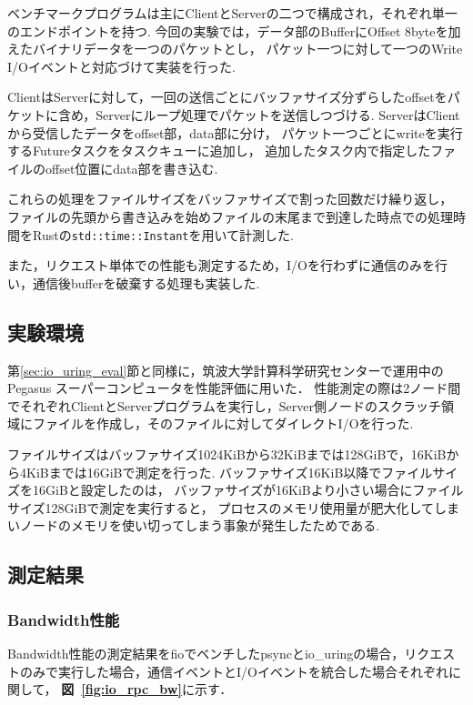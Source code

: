 \documentclass[a4paper,11pt,openany]{jreport}
\newcommand\figref[1]{\textbf{図~\ref{fig:#1}}}
\begin{document}
ベンチマークプログラムは主にClientとServerの二つで構成され，それぞれ単一のエンドポイントを持つ.
今回の実験では，データ部のBufferにOffset 8byteを加えたバイナリデータを一つのパケットとし，
パケット一つに対して一つのWrite I/Oイベントと対応づけて実装を行った.

ClientはServerに対して，一回の送信ごとにバッファサイズ分ずらしたoffsetをパケットに含め，Serverにループ処理でパケットを送信しつづける.
ServerはClientから受信したデータをoffset部，data部に分け，
パケット一つごとにwriteを実行するFutureタスクをタスクキューに追加し，
追加したタスク内で指定したファイルのoffset位置にdata部を書き込む.

これらの処理をファイルサイズをバッファサイズで割った回数だけ繰り返し，
ファイルの先頭から書き込みを始めファイルの末尾まで到達した時点での処理時間をRustの\lstinline|std::time::Instant|を用いて計測した.

また，リクエスト単体での性能も測定するため，I/Oを行わずに通信のみを行い，通信後bufferを破棄する処理も実装した.

\subsection{実験環境}
第\ref{sec:io_uring_eval}節と同様に，筑波大学計算科学研究センターで運用中のPegasus スーパーコンピュータを性能評価に用いた．
性能測定の際は2ノード間でそれぞれClientとServerプログラムを実行し，Server側ノードのスクラッチ領域にファイルを作成し，そのファイルに対してダイレクトI/Oを行った.

ファイルサイズはバッファサイズ1024KiBから32KiBまでは128GiBで，16KiBから4KiBまでは16GiBで測定を行った.
バッファサイズ16KiB以降でファイルサイズを16GiBと設定したのは，
バッファサイズが16KiBより小さい場合にファイルサイズ128GiBで測定を実行すると，
プロセスのメモリ使用量が肥大化してしまいノードのメモリを使い切ってしまう事象が発生したためである.

\subsection{測定結果}\label{sec:io_rpc_result}
\subsubsection{Bandwidth性能}
Bandwidth性能の測定結果をfioでベンチしたpsyncとio\_uringの場合，リクエストのみで実行した場合，通信イベントとI/Oイベントを統合した場合それぞれに関して，
\figref{io_rpc_bw}に示す．
\end{document}
